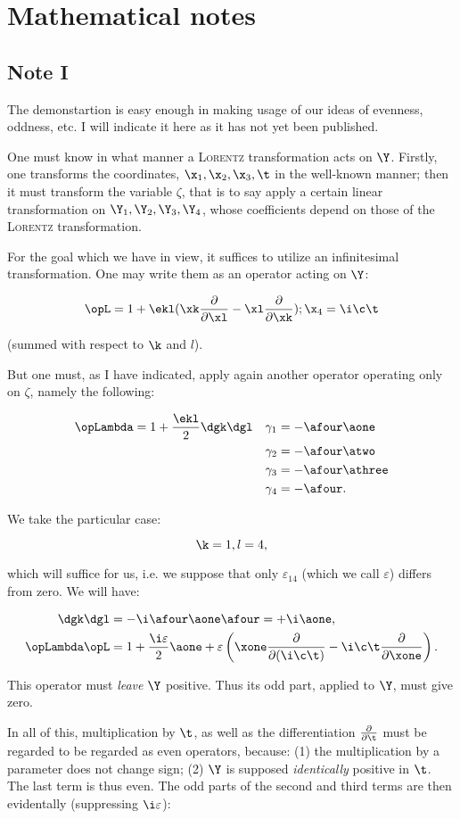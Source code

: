 \documentclass{article}
\newcommand{\uequ}[1]{
\begin{equation*}
#1
\end{equation*}
}
\newcommand{\var}[1]{#1}
\newcommand{\oppddX}[1]{
\frac{\partial}{\partial{#1}}
}
\renewcommand{\it}[1]{\textit{#1}}
\renewcommand{\sc}[1]{\textsc{#1}}
\newcommand{\dgX}[1]{\var{\gamma}_{#1}}
\begin{document}
\section{Mathematical notes}

\subsection{Note I}
The demonstartion is easy enough in making usage of our ideas of evenness, oddness, etc. I will indicate it here as it has not yet been published.

One must know in what manner a \sc{Lorentz} transformation acts on $\Y$. Firstly, one transforms the coordinates, $\x_1, \x_2, \x_3, \t$ in the well-known manner; then it must transform the variable $\var{\zeta}$, that is to say apply a certain linear transformation on $\Y_1, \Y_2, \Y_3, \Y_4$, whose coefficients depend on those of the \sc{Lorentz} transformation.

For the goal which we have in view, it suffices to utilize an infinitesimal transformation. One may write them as an operator acting on $\Y$:
\uequ{
\opL = 1 + \ekl(\xk\oppddX{\xl} - \xl\oppddX{\xk}); \x_4 = \i\c\t
}
(summed with respect to $\k$ and $\var{l}$).

But one must, as I have indicated, apply again another operator operating only on $\var{\zeta}$, namely the following:
\uequ{
\begin{split}
\opLambda = 1 + \frac{\ekl}{2}\dgk\dgl \quad
\dgX{1} &= -\afour\aone \\
\dgX{2} &= -\afour\atwo \\
\dgX{3} &= -\afour\athree \\
\dgX{4} &= -\afour.
\end{split}
}

We take the particular case:
\uequ{
\k = 1, \var{l} = 4,
}
which will suffice for us, i.e. we suppose that only $\var{\varepsilon}_{14}$ (which we call $\var{\varepsilon}$) differs from zero. We will have:
\uequ{
\begin{split}
\dgk\dgl &= -\i\afour\aone\afour = +\i\aone, \\
\opLambda\opL &= 1 + \frac{\i\var{\varepsilon}}{2}\aone + \var{\varepsilon}\left(
\xone\oppddX{(\i\c\t)} - \i\c\t\oppddX{\xone}
\right).
\end{split}
}

This operator must \it{leave} $\Y$ positive. Thus its odd part, applied to $\Y$, must give zero.

In all of this, multiplication by $\t$, as well as the differentiation $\oppddX{\t}$ must be regarded to be regarded as even operators, because: (1) the multiplication by a parameter does not change sign; (2) $\Y$ is supposed \it{identically} positive in $\t$. The last term is thus even. The odd parts of the second and third terms are then evidentally (suppressing $\i\var{\varepsilon}$):
\end{document}
